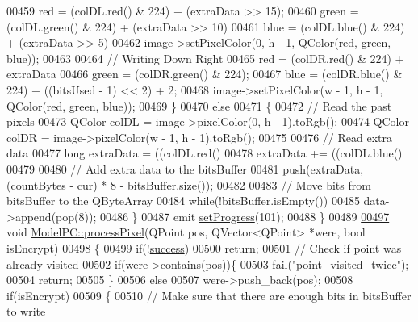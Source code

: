 \begin{DoxyCode}
00459         red = (colDL.red() & 224) + (extraData >> 15);
00460         green = (colDL.green() & 224) + (extraData >> 10) %
00461         blue = (colDL.blue() & 224) + (extraData >> 5) %
00462         image->setPixelColor(0, h - 1, QColor(red, green, blue));
00463 
00464         \textcolor{comment}{// Writing Down Right}
00465         red = (colDR.red() & 224) + extraData %
00466         green = (colDR.green() & 224);
00467         blue = (colDR.blue() & 224) + ((bitsUsed - 1) << 2) + 2;
00468         image->setPixelColor(w - 1, h - 1, QColor(red, green, blue));
00469     \}
00470     \textcolor{keywordflow}{else}
00471     \{
00472         \textcolor{comment}{// Read the past pixels}
00473         QColor colDL = image->pixelColor(0, h - 1).toRgb();
00474         QColor colDR = image->pixelColor(w - 1, h - 1).toRgb();
00475 
00476         \textcolor{comment}{// Read extra data}
00477         \textcolor{keywordtype}{long} extraData = ((colDL.red() %
00478         extraData += ((colDL.blue() %
00479 
00480         \textcolor{comment}{// Add extra data to the bitsBuffer}
00481         push(extraData, (countBytes - cur) * 8 - bitsBuffer.size());
00482 
00483         \textcolor{comment}{// Move bits from bitsBuffer to the QByteArray}
00484         \textcolor{keywordflow}{while}(!bitsBuffer.isEmpty())
00485             data->append(pop(8));
00486     \}
00487     emit \hyperlink{class_model_p_c_afdcd80f0ed5062e145a71f09b0897547}{setProgress}(101);
00488 \}
00489 
\hypertarget{modelpc_8cpp_source.tex_l00497}{}\hyperlink{class_model_p_c_a1171f9fe1550133dc9053a46b4e5bcfd}{00497} \textcolor{keywordtype}{void} \hyperlink{class_model_p_c_a1171f9fe1550133dc9053a46b4e5bcfd}{ModelPC::processPixel}(QPoint pos, QVector<QPoint> *were, \textcolor{keywordtype}{bool} isEncrypt)
00498 \{
00499     \textcolor{keywordflow}{if}(!\hyperlink{class_model_p_c_a945ffbbc44a832b953c191debd448f4c}{success})
00500         \textcolor{keywordflow}{return};
00501     \textcolor{comment}{// Check if point was already visited}
00502     \textcolor{keywordflow}{if}(were->contains(pos))\{
00503         \hyperlink{class_model_p_c_a47464b59b7e37fcee25e55475708aabd}{fail}(\textcolor{stringliteral}{"point\_visited\_twice"});
00504         \textcolor{keywordflow}{return};
00505     \}
00506     \textcolor{keywordflow}{else}
00507         were->push\_back(pos);
00508     \textcolor{keywordflow}{if}(isEncrypt)
00509     \{
00510         \textcolor{comment}{// Make sure that there are enough bits in bitsBuffer to write}

\end{DoxyCode}
